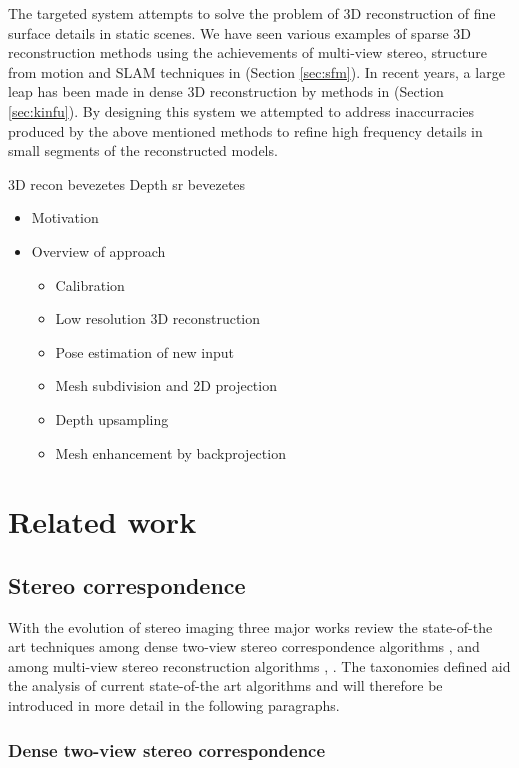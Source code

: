 \documentclass{ucl_thesis}
\newcommand{\secref}[1]{(Section \ref{#1})}
\begin{document}
\par The targeted system attempts to solve the problem of 3D reconstruction of fine surface details in static scenes. We have seen various examples of sparse 3D reconstruction methods using the achievements of multi-view stereo, structure from motion and SLAM techniques in \secref{sec:sfm}. In recent years, a large leap has been made in dense 3D reconstruction by methods in \secref{sec:kinfu}. By designing this system we attempted to address inaccurracies produced by the above mentioned methods to refine high frequency details in small segments of the reconstructed models.

3D recon bevezetes
Depth sr bevezetes

\label{chp:background}
	\begin{itemize}	
		\item Motivation
		\item Overview of approach
		\begin{itemize}
			\item Calibration
			\item Low resolution 3D reconstruction
			\item Pose estimation of new input
			\item Mesh subdivision and 2D projection
			\item Depth upsampling
			\item Mesh enhancement by backprojection
		\end{itemize}
	\end{itemize}


\chapter{Related work} 
\label{chp:related_work}

\section{Stereo correspondence}
With the evolution of stereo imaging three major works review the state-of-the art techniques among dense two-view stereo correspondence algorithms \cite{ScharsteinS02}, and among multi-view stereo reconstruction algorithms \cite{Seitz:2006}, \cite{Strecha:2008}. The taxonomies defined aid the analysis of current state-of-the art algorithms and will therefore be introduced in more detail in the following paragraphs.

\subsection{Dense two-view stereo correspondence} 
\label{subsub:densestereo}
\end{document}

